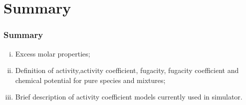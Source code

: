 \documentclass[10pt,compress,handout]{beamer}
\begin{document}
\section{Summary}

\begin{frame}
 \frametitle{Summary}
   \begin{enumerate}[(i)]
     \item Excess molar properties;
     \item Definition of activity,activity coefficient, fugacity, fugacity coefficient and chemical potential for pure species and mixtures;
     \item Brief description of activity coefficient models currently used in simulator.
   \end{enumerate}
\end{frame}
\end{document}

